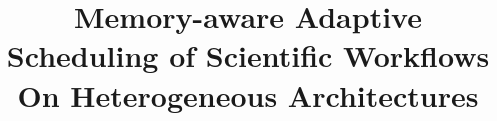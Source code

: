 \documentclass[conference]{IEEEtran}
\begin{document}
    \title{Memory-aware Adaptive Scheduling of Scientific Workflows On Heterogeneous Architectures\\
    }



\maketitle
\end{document}
